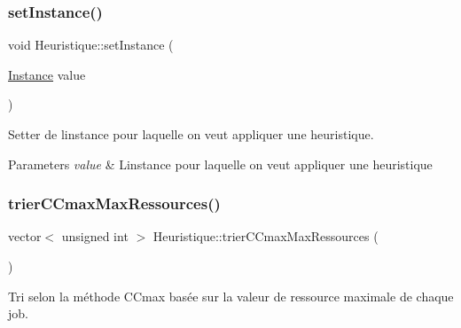\subsubsection{\texorpdfstring{set\+Instance()}{setInstance()}}
{\footnotesize\ttfamily void Heuristique\+::set\+Instance (\begin{DoxyParamCaption}\item[{\hyperlink{classInstance}{Instance}}]{value }\end{DoxyParamCaption})}



Setter de l\textquotesingle{}instance pour laquelle on veut appliquer une heuristique. 


\begin{DoxyParams}{Parameters}
{\em value} & L\textquotesingle{}instance pour laquelle on veut appliquer une heuristique \\
\hline
\end{DoxyParams}
\mbox{\label{classHeuristique_a02aae5127f941e55311e8bbd3b4afd3c}} 
\subsubsection{\texorpdfstring{trier\+C\+Cmax\+Max\+Ressources()}{trierCCmaxMaxRessources()}}
{\footnotesize\ttfamily vector$<$ unsigned int $>$ Heuristique\+::trier\+C\+Cmax\+Max\+Ressources (\begin{DoxyParamCaption}{ }\end{DoxyParamCaption})}



Tri selon la méthode C\+Cmax basée sur la valeur de ressource maximale de chaque job. 

